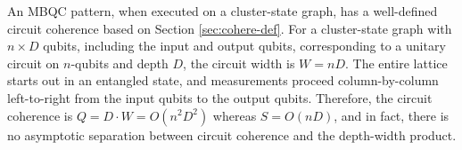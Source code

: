 An MBQC pattern, when executed on a cluster-state graph, has a well-defined
circuit coherence based on Section \ref{sec:cohere-def}. For a cluster-state
graph with $n \times D$ qubits, including the input and output qubits,
corresponding to a unitary circuit on $n$-qubits
and depth $D$, the circuit width is $W = nD$. The entire lattice starts out
in an entangled state, and measurements proceed column-by-column
left-to-right from the input qubits to the output qubits. Therefore,
the circuit coherence is $Q = D\cdot W = O(n^2D^2)$ whereas $S = O(nD)$, and in fact, there is no
asymptotic separation between circuit coherence and the depth-width product.
